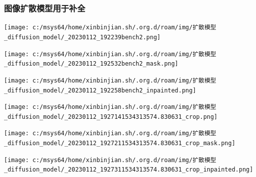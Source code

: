 \documentclass[a4paper, 11pt]{article}
\begin{document}
\subsubsection*{图像扩散模型用于补全}
\label{sec:org3f78272}
\begin{center}
\texttt{[image: c:/msys64/home/xinbinjian.sh/.org.d/roam/img/扩散模型\_diffusion\_model/\_20230112\_192239bench2.png]}
\end{center}
\begin{center}
\texttt{[image: c:/msys64/home/xinbinjian.sh/.org.d/roam/img/扩散模型\_diffusion\_model/\_20230112\_192532bench2\_mask.png]}
\end{center}
\begin{center}
\texttt{[image: c:/msys64/home/xinbinjian.sh/.org.d/roam/img/扩散模型\_diffusion\_model/\_20230112\_192258bench2\_inpainted.png]}
\end{center}
\begin{center}
\texttt{[image: c:/msys64/home/xinbinjian.sh/.org.d/roam/img/扩散模型\_diffusion\_model/\_20230112\_1927141534313574.830631\_crop.png]}
\end{center}
\begin{center}
\texttt{[image: c:/msys64/home/xinbinjian.sh/.org.d/roam/img/扩散模型\_diffusion\_model/\_20230112\_1927211534313574.830631\_crop\_mask.png]}
\end{center}
\begin{center}
\texttt{[image: c:/msys64/home/xinbinjian.sh/.org.d/roam/img/扩散模型\_diffusion\_model/\_20230112\_1927311534313574.830631\_crop\_inpainted.png]}
\end{center}
\end{document}

